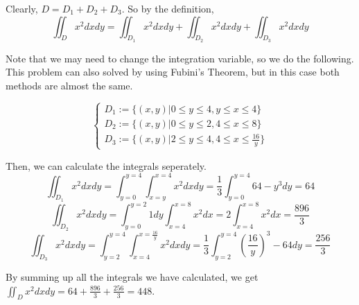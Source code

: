 \documentclass[12pt]{article}
\begin{document}
Clearly, $D = D_1 + D_2 + D_3$. So by the definition,
\[ \iint_D x^2 dxdy = \iint_{D_1} x^2 dxdy +
\iint_{D_2} x^2 dxdy + \iint_{D_3} x^2 dxdy\]

Note that we may need to change the integration variable,
so we do the following. This problem can also solved by using Fubini's
Theorem, but in this case both methods are almost the same.

\[\begin{cases}
    D_1 := \lbrace (x,y) \Big \vert 0 \leq y \leq 4, y \leq x \leq 4 \rbrace \\
    D_2 := \lbrace (x,y) \Big \vert 0 \leq y \leq 2, 4 \leq x \leq 8 \rbrace \\
    D_3 := \lbrace (x,y) \Big \vert 2 \leq y \leq 4, 4 \leq x \leq \displaystyle{\frac{16}{y} }\rbrace
\end{cases}\]

Then, we can calculate the integrals seperately.
\[ \iint_{D_1} x^2 dxdy = 
\int_{y = 0}^{y = 4}\int_{x = y}^{x = 4} x^2 dxdy
= \frac{1}{3}\int_{y=0}^{y=4} 64 - y^3 dy
= 64\]
\[ \iint_{D_2} x^2 dxdy = \int_{y=0}^{y=2} 1 dy 
\int_{x=4}^{x=8} x^2 dx = 2\int_{x=4}^{x=8}x^2 dx
= \frac{896}{3}\]
\[ \iint_{D_3} x^2 dxdy = \int_{y=2}^{y=4} 
\int_{x = 4}^{x = \frac{16}{y}}x^2 dxdy =
\frac{1}{3}\int_{y=2}^{y=4} \left(\frac{16}{y}\right)^3 - 64 dy
= \frac{256}{3}\] 

By summing up all the integrals we have calculated,
we get $\displaystyle{\iint_D x^2 dxdy} = \displaystyle{64 + 
\frac{896}{3}+\frac{256}{3}} = 448$.

\newpage
\end{document}
